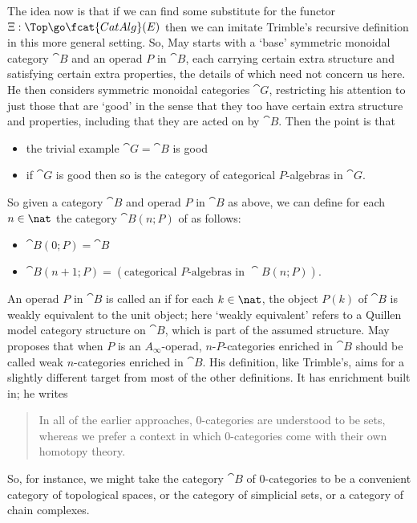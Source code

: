 The idea now is that if we can find some substitute for the functor $\Xi:
\Top \go \fcat{CatAlg}(E)$ then we can imitate Trimble's recursive
definition in this more general setting.  So, May starts with a `base'
symmetric monoidal category $\cat{B}$ and an operad $P$ in $\cat{B}$, each
carrying certain extra structure and satisfying certain extra properties,
the details of which need not concern us here.  He then considers symmetric
monoidal categories $\cat{G}$, restricting his attention to just those that
are `good' in the sense that they too have certain extra structure and
properties, including that they are acted on by $\cat{B}$.  Then the point
is that
%
\begin{itemize}
\item the trivial example $\cat{G} = \cat{B}$ is good
\item if $\cat{G}$ is good then so is the category of categorical
  $P$-algebras in $\cat{G}$.
\end{itemize}
%
So given a category $\cat{B}$ and operad $P$ in $\cat{B}$ as above, we can
define for each $n\in\nat$ the category $\cat{B}(n; P)$ of
%
%
%
%
%
as follows: 
%
\begin{itemize}
\item $\cat{B}(0; P) = \cat{B}$
\item $\cat{B}(n+1; P) = (\textrm{categorical } P \textrm{-algebras in } 
\cat{B}(n; P) )$.
\end{itemize}
% 
An operad $P$ in $\cat{B}$ is called an %
%
%
if for each $k\in\nat$, the object $P(k)$ of $\cat{B}$ is weakly equivalent
to the unit object; here `weakly equivalent' refers to a Quillen model%
%
%
category structure on $\cat{B}$, which is part of the assumed structure.
May proposes that when $P$ is an $A_\infty$-operad, $n$-$P$-categories
enriched in $\cat{B}$ should be called weak $n$-categories enriched in
$\cat{B}$.  His definition, like Trimble's, aims for a slightly different
target from most of the other definitions.  It has enrichment built in; he
writes
%
\begin{quote}
  In all of the earlier approaches, $0$-categories are understood to be
  sets, whereas we prefer a context in which $0$-categories come with their
  own homotopy%
%
%
%
%
%
theory.
\end{quote}
%
So, for instance, we might take the category $\cat{B}$ of $0$-categories to
be a convenient category of topological spaces, or the category of
simplicial sets, or a category of chain complexes.%
%
%
%
%
 



